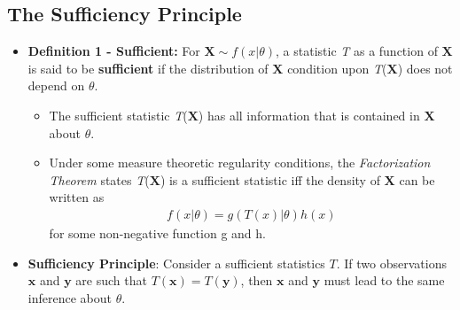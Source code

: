 \documentclass[12pt, oneside]{article}
\newcommand*{\bx}{\bm{x}}
\newcommand*{\by}{\bm{y}}
\newcommand*{\bX}{\bm{X}}
\begin{document}
\subsection{The Sufficiency Principle}
\begin{itemize}
    \item \textbf{Definition 1 - Sufficient:} For $\bX \sim f(x|\theta)$, a statistic \emph{T} as a function of $\bX$ is said to be \textbf{sufficient} if the distribution of $\bX$ condition upon \emph{T}($\bX$) does not depend on $\theta$.
        \begin{itemize}
            \item The sufficient statistic \emph{T}($\bX$) has all information that is contained in $\bX$ about $\theta$.
        
            \item Under some measure theoretic regularity conditions, the \emph{Factorization Theorem} states \emph{T}($\bX$) is a sufficient statistic iff the density of $\bX$ can be written as 
            \begin{align*}
                f(x|\theta) = g(T(x)|\theta)h(x)
            \end{align*}
            for some non-negative function g and h.
        \end{itemize}
    
    \item \textbf{Sufficiency Principle}: Consider a sufficient statistics $T$. If two observations $\bx$ and $\by$ are such that $T(\bx) = T(\by)$, then $\bx$ and $\by$ must lead to the same inference about $\theta$.
    

\end{itemize}
\end{document}

